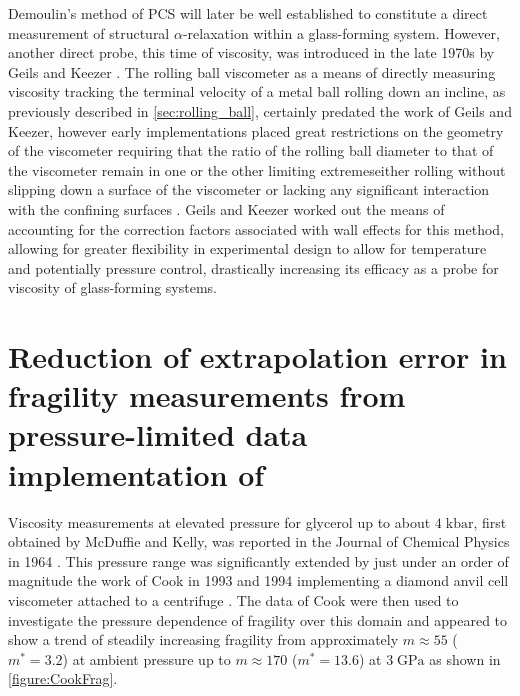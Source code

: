 Demoulin's method of PCS will later be well established to constitute a direct measurement of structural $\alpha$-relaxation within a glass-forming system.  However, another direct probe, this time of viscosity, was introduced in the late 1970s by Geils and Keezer \nolinebreak\cite{Geils}.  The rolling ball viscometer as a means of directly measuring viscosity \via tracking the terminal velocity of a metal ball rolling down an incline, as previously described in \sect \nolinebreak\ref{sec:rolling_ball}, certainly predated the work of Geils and Keezer, however early implementations placed great restrictions on the geometry of the viscometer requiring that the ratio of the rolling ball diameter to that of the viscometer remain in one or the other limiting extremes\textemdash either rolling without slipping down a surface of the viscometer or lacking any significant interaction with the confining surfaces \nolinebreak\cite{Sutterby,Hubbard}.  Geils and Keezer worked out the means of accounting for the correction factors associated with wall effects for this method, allowing for greater flexibility in experimental design to allow for temperature and potentially pressure control, drastically increasing its efficacy as a probe for viscosity of glass-forming systems.  

\section{Reduction of extrapolation error in fragility measurements from pressure-limited data \via implementation of \tgp}

	Viscosity measurements at elevated pressure for glycerol up to about $4\;\si{\kilo\bar}$, first obtained by McDuffie and Kelly, was reported in the Journal of Chemical Physics in 1964 \nolinebreak\cite{McDuffie}.  This pressure range was significantly extended by just under an order of magnitude \via the work of Cook \etal in 1993 and 1994 implementing a diamond anvil cell viscometer attached to a centrifuge \nolinebreak\cite{Cook,Cook2}.  The data of Cook \etal were then used to investigate the pressure dependence of fragility  over this domain and appeared to show a trend of steadily increasing fragility from approximately $m\approx 55$ ($m^*=3.2$) at ambient pressure up to $m\approx 170$ ($m^*=13.6$) at $3\;\si{\giga\pascal}$ as shown in \fig \nolinebreak \ref{figure:CookFrag}.
	
